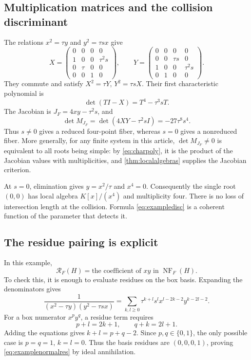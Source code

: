 \documentclass[11pt,letterpaper]{article}
\theoremstyle{definition}
\theoremstyle{remark}
\newcommand{\RR}{\mathscr R}
\newcommand{\NF}{\operatorname{NF}}
\numberwithin{equation}{section}
\begin{document}
\subsection{Multiplication matrices and the collision discriminant}
The relations $x^2=\tau y$ and $y^2=\tau sx$ give
\begin{equation}\label{eq:examplematrices}
 X=\begin{pmatrix}
 0&0&0&0\\1&0&0&\tau^2s\\0&\tau&0&0\\0&0&1&0
 \end{pmatrix},\qquad
 Y=\begin{pmatrix}
 0&0&0&0\\0&0&\tau s&0\\1&0&0&\tau^2s\\0&1&0&0
 \end{pmatrix}.
\end{equation}
They commute and satisfy $X^2=\tau Y$, $Y^2=\tau sX$. Their first characteristic polynomial is
\begin{equation}\label{eq:examplechar}
 \det(TI-X)=T^4-\tau^3sT.
\end{equation}
The Jacobian is $J_F=4xy-\tau^2s$, and
\begin{equation}\label{eq:exampledisc}
 \det M_{J_F}=\det(4XY-\tau^2sI)=-27\tau^8s^4.
\end{equation}
Thus $s\ne0$ gives a reduced four-point fiber, whereas $s=0$ gives a nonreduced fiber. More generally, for any finite system in this article, $\det M_{J_F}\ne0$ is equivalent to all roots being simple: by \eqref{eq:charpoly}, it is the product of the Jacobian values with multiplicities, and \cref{thm:localalgebras} supplies the Jacobian criterion.

At $s=0$, elimination gives $y=x^2/\tau$ and $x^4=0$. Consequently the single root $(0,0)$ has local algebra $K[x]/(x^4)$ and multiplicity four. There is no loss of intersection length at the collision. Formula \eqref{eq:exampledisc} is a coherent function of the parameter that detects it.

\subsection{The residue pairing is explicit}
In this example,
\begin{equation}\label{eq:examplenormalres}
 \RR_F(H)=\text{the coefficient of }xy\text{ in }\NF_F(H).
\end{equation}
To check this, it is enough to evaluate residues on the box basis. Expanding the denominators gives
\[
 \frac1{(x^2-\tau y)(y^2-\tau sx)}
 =\sum_{k,l\ge0}\tau^{k+l}s^l
          x^{l-2k-2}y^{k-2l-2}.
\]
For a box numerator $x^py^q$, a residue term requires
\[
 p+l=2k+1,\qquad q+k=2l+1.
\]
Adding the equations gives $k+l=p+q-2$. Since $p,q\in\{0,1\}$, the only possible case is $p=q=1$, $k=l=0$. Thus the basis residues are $(0,0,0,1)$, proving \eqref{eq:examplenormalres} by ideal annihilation.
\end{document}
